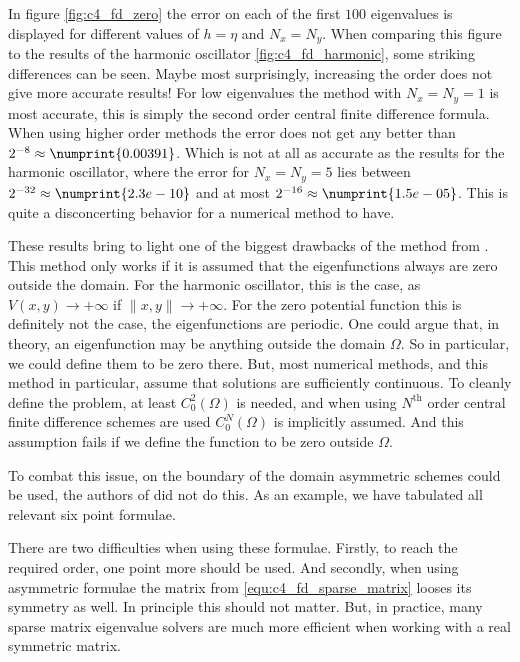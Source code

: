 In figure \ref{fig:c4_fd_zero} the error on each of the first $100$ eigenvalues is displayed for different values of $h = \eta$ and $N_x = N_y$. When comparing this figure to the results of the harmonic oscillator \ref{fig:c4_fd_harmonic}, some striking differences can be seen. Maybe most surprisingly, increasing the order does not give more accurate results! For low eigenvalues the method with $N_x=N_y=1$ is most accurate, this is simply the second order central finite difference formula. When using higher order methods the error does not get any better than $2^{-8}\approx \numprint{0.00391}$. Which is not at all as accurate as the results for the harmonic oscillator, where the error for $N_x=N_y = 5$ lies between $2^{-32} \approx \numprint{2.3e-10}$ and at most $2^{-16} \approx \numprint{1.5e-05}$. This is quite a disconcerting behavior for a numerical method to have.

These results bring to light one of the biggest drawbacks of the method from \cite{wang_new_2009}. This method only works if it is assumed that the eigenfunctions always are zero outside the domain. For the harmonic oscillator, this is the case, as $V(x, y) \to +\infty$ if $\|x, y\| \to +\infty$. For the zero potential function this is definitely not the case, the eigenfunctions are periodic. One could argue that, in theory, an eigenfunction may be anything outside the domain $\Omega$. So in particular, we could define them to be zero there. But, most numerical methods, and this method in particular, assume that solutions are sufficiently continuous. To cleanly define the problem, at least $C_0^2(\Omega)$ is needed, and when using $N^\text{th}$ order central finite difference schemes are used $C_0^{N}(\Omega)$ is implicitly assumed. And this assumption fails if we define the function to be zero outside $\Omega$.

To combat this issue, on the boundary of the domain asymmetric schemes could be used, the authors of \cite{wang_new_2009} did not do this. As an example, we have tabulated all relevant six point formulae.
\begin{center}
    
\end{center}
There are two difficulties when using these formulae. Firstly, to reach the required order, one point more should be used. And secondly, when using asymmetric formulae the matrix from \eqref{equ:c4_fd_sparse_matrix} looses its symmetry as well. In principle this should not matter. But, in practice, many sparse matrix eigenvalue solvers are much more efficient when working with a real symmetric matrix.




